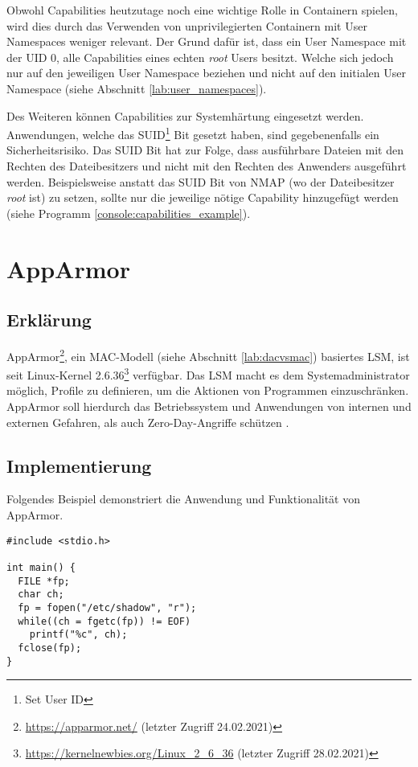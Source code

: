 Obwohl Capabilities heutzutage noch eine wichtige Rolle in Containern spielen,
wird dies durch das Verwenden von unprivilegierten Containern mit User
Namespaces weniger relevant. Der Grund dafür ist, dass ein User Namespace mit
der UID 0, alle Capabilities eines echten \emph{root} Users besitzt. Welche
sich jedoch nur auf den jeweiligen User Namespace beziehen und nicht auf den
initialen User Namespace (siehe Abschnitt \ref{lab:user_namespaces}).

Des Weiteren können Capabilities zur Systemhärtung eingesetzt werden.
Anwendungen, welche das SUID\footnote{Set User ID} Bit gesetzt haben, sind
gegebenenfalls ein Sicherheitsrisiko. Das SUID Bit hat zur Folge, dass
ausführbare Dateien mit den Rechten des Dateibesitzers und nicht mit den
Rechten des Anwenders ausgeführt werden. Beispielsweise anstatt das SUID Bit
von NMAP (wo der Dateibesitzer \emph{root} ist) zu setzen, sollte nur die
jeweilige nötige Capability hinzugefügt werden (siehe Programm
\ref{console:capabilities_example}).

\clearpage

\section{AppArmor}
\label{lab:apparmor}

\subsection{Erklärung}
AppArmor\footnote{\url{https://apparmor.net/} (letzter Zugriff 24.02.2021)},
ein MAC-Modell (siehe Abschnitt \ref{lab:dacvsmac}) basiertes LSM, ist seit Linux-Kernel
2.6.36\footnote{\url{https://kernelnewbies.org/Linux\_2\_6\_36} (letzter
Zugriff 28.02.2021)} verfügbar. Das LSM macht es dem Systemadministrator
möglich, Profile zu definieren, um die Aktionen von Programmen einzuschränken.
AppArmor soll hierdurch das Betriebssystem und Anwendungen von internen und
externen Gefahren, als auch Zero-Day-Angriffe schützen \cite{apparmor_website}.

\subsection{Implementierung}
Folgendes Beispiel demonstriert die Anwendung und Funktionalität von AppArmor.

\begin{lstlisting}[label={console:readShadowc},caption={\emph{readShadow.c}:
Programm liest \emph{/etc/shadow} }]
#include <stdio.h>

int main() {
  FILE *fp;
  char ch;
  fp = fopen("/etc/shadow", "r");
  while((ch = fgetc(fp)) != EOF)
    printf("%c", ch);
  fclose(fp);
}
\end{lstlisting}

